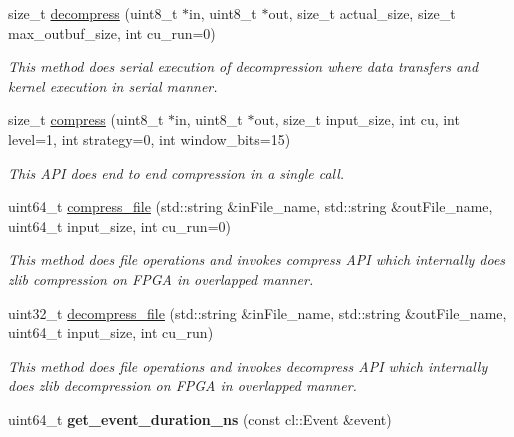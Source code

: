 \begin{DoxyCompactItemize}
\item 
size\-\_\-t \hyperlink{classxf_1_1compression_1_1xfZlib_a5dc1443008daebba8e3aa47c1962434a}{decompress} (uint8\-\_\-t $\ast$in, uint8\-\_\-t $\ast$out, size\-\_\-t actual\-\_\-size, size\-\_\-t max\-\_\-outbuf\-\_\-size, int cu\-\_\-run=0)
\begin{DoxyCompactList}\small\item\em This method does serial execution of decompression where data transfers and kernel execution in serial manner. \end{DoxyCompactList}\item 
size\-\_\-t \hyperlink{classxf_1_1compression_1_1xfZlib_aed3a52d3bcb4e2603d367a559c85e175}{compress} (uint8\-\_\-t $\ast$in, uint8\-\_\-t $\ast$out, size\-\_\-t input\-\_\-size, int cu, int level=1, int strategy=0, int window\-\_\-bits=15)
\begin{DoxyCompactList}\small\item\em This A\-P\-I does end to end compression in a single call. \end{DoxyCompactList}\item 
uint64\-\_\-t \hyperlink{classxf_1_1compression_1_1xfZlib_a4dae7f3471aa3788ffc0c11a9b6196fc}{compress\-\_\-file} (std\-::string \&in\-File\-\_\-name, std\-::string \&out\-File\-\_\-name, uint64\-\_\-t input\-\_\-size, int cu\-\_\-run=0)
\begin{DoxyCompactList}\small\item\em This method does file operations and invokes compress A\-P\-I which internally does zlib compression on F\-P\-G\-A in overlapped manner. \end{DoxyCompactList}\item 
uint32\-\_\-t \hyperlink{classxf_1_1compression_1_1xfZlib_a847206ba337f6811dbd477c1533586c3}{decompress\-\_\-file} (std\-::string \&in\-File\-\_\-name, std\-::string \&out\-File\-\_\-name, uint64\-\_\-t input\-\_\-size, int cu\-\_\-run)
\begin{DoxyCompactList}\small\item\em This method does file operations and invokes decompress A\-P\-I which internally does zlib decompression on F\-P\-G\-A in overlapped manner. \end{DoxyCompactList}\item 
\hypertarget{classxf_1_1compression_1_1xfZlib_aa2477f22a23fc8ce1ffa8c968c588f29}{uint64\-\_\-t {\bfseries get\-\_\-event\-\_\-duration\-\_\-ns} (const cl\-::\-Event \&event)}\label{classxf_1_1compression_1_1xfZlib_aa2477f22a23fc8ce1ffa8c968c588f29}


\end{DoxyCompactItemize}
